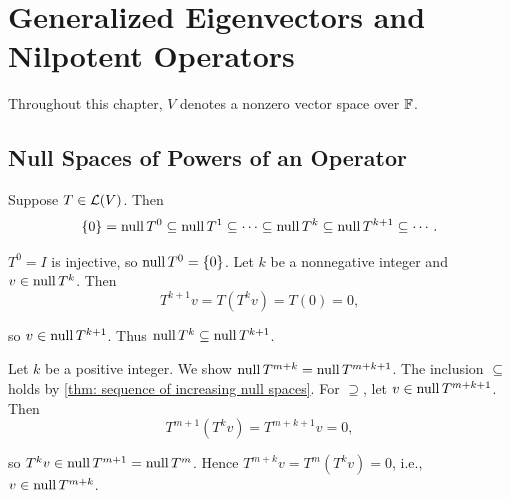 \section{Generalized Eigenvectors and Nilpotent Operators}

Throughout this chapter, $V$ denotes a \fd nonzero vector space over $\mathbb{F}$.

\subsection{Null Spaces of Powers of an Operator}

\begin{thm}
  \label{thm: sequence of increasing null spaces}
  Suppose $T \in \mathcal{L}(V)$. Then
  \begin{equation}
    \{0\} = \operatorname{null} T^0 \subseteq \operatorname{null} T^1 \subseteq \cdots \subseteq \operatorname{null} T^k \subseteq \operatorname{null} T^{k+1} \subseteq \cdots.
  \end{equation}
\end{thm}
\begin{prf}
  $T^0 = I$ is injective, so $\operatorname{null} T^0 = \{0\}$.
  Let $k$ be a nonnegative integer and $v \in \operatorname{null} T^k$. Then
  \begin{equation}
    T^{k+1} v = T(T^k v) = T(0) = 0,
  \end{equation}

  so $v \in \operatorname{null} T^{k+1}$. Thus $\operatorname{null} T^k \subseteq \operatorname{null} T^{k+1}$.
\end{prf}

\begin{prf}
  Let $k$ be a positive integer. We show $\operatorname{null} T^{m+k} = \operatorname{null} T^{m+k+1}$.
  The inclusion $\subseteq$ holds by \ref{thm: sequence of increasing null spaces}.
  For $\supseteq$, let $v \in \operatorname{null} T^{m+k+1}$. Then
  \begin{equation}
    T^{m+1} (T^k v) = T^{m+k+1} v = 0,
  \end{equation}

  so $T^k v \in \operatorname{null} T^{m+1} = \operatorname{null} T^m$. Hence $T^{m+k} v = T^m (T^k v) = 0$, i.e., $v \in \operatorname{null} T^{m+k}$.
\end{prf}

